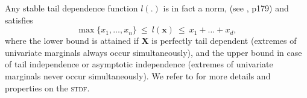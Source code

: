 Any stable tail dependence function $l(.)$ is in fact a norm, (see \cite{Falk94}, p179) and satisfies $$\max\{x_1,\ldots, x_n\} ~\le~ l(\mathbf{x}) ~\le~ x_1 + \ldots + x_d, $$ where the lower bound is attained if $\mathbf{X}$ is perfectly tail dependent (extremes of univariate marginals always occur simultaneously), and the upper bound in case of tail independence or asymptotic independence (extremes of univariate marginals never occur simultaneously).
We refer to \cite{Falk94} for more details and properties on the
\textsc{stdf}.





